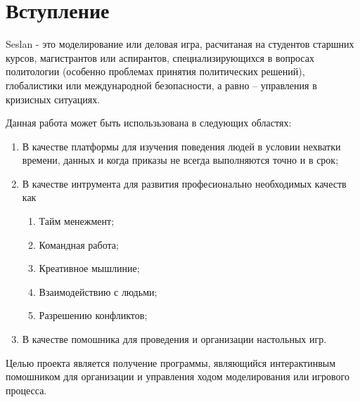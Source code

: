 \newpage
\section{Вступление}
	Seslan - это моделирование или деловая игра, расчитаная на студентов старшних курсов, магистрантов или аспирантов, специализирующихся в вопросах политологии (особенно проблемах принятия политических решений), глобалистики или международной безопасности, а равно – управления в кризисных ситуациях.
	
	Данная работа может быть использьзована в следующих областях:
	\begin{enumerate}
		\item В качестве платформы для изучения поведения людей в условии нехватки времени, данных и когда приказы не всегда выполняются точно и в срок;
		\item В качестве интрумента для развития професионально необходимых качеств как 
			\begin{enumerate}
				\item Тайм менежмент;
				\item Командная работа;
				\item Креативное мышлиние;
				\item Взаимодействию с людьми;
				\item Разрешению конфликтов;
			\end{enumerate}
		\item В качестве помошника для проведения и организации настольных игр.
	\end{enumerate}
	
	Целью проекта является получение программы, являющийся интерактинвым помошником для организации и управления ходом моделирования или игрового процесса.
	
